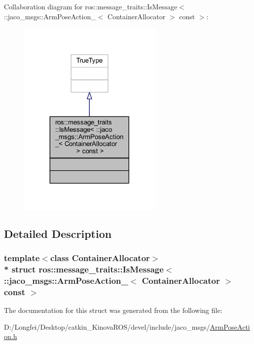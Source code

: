 Collaboration diagram for ros\+:\+:message\+\_\+traits\+:\+:Is\+Message$<$ \+:\+:jaco\+\_\+msgs\+:\+:Arm\+Pose\+Action\+\_\+$<$ Container\+Allocator $>$ const $>$\+:
\nopagebreak
\begin{figure}[H]
\begin{center}
\leavevmode
\includegraphics[width=200pt]{d2/daa/structros_1_1message__traits_1_1IsMessage_3_01_1_1jaco__msgs_1_1ArmPoseAction___3_01ContainerAll62b517e228cf0f5f59a5533fa75f8451}
\end{center}
\end{figure}


\subsection{Detailed Description}
\subsubsection*{template$<$class Container\+Allocator$>$\\*
struct ros\+::message\+\_\+traits\+::\+Is\+Message$<$ \+::jaco\+\_\+msgs\+::\+Arm\+Pose\+Action\+\_\+$<$ Container\+Allocator $>$ const  $>$}



The documentation for this struct was generated from the following file\+:\begin{DoxyCompactItemize}
\item 
D\+:/\+Longfei/\+Desktop/catkin\+\_\+\+Kinova\+R\+O\+S/devel/include/jaco\+\_\+msgs/\hyperlink{ArmPoseAction_8h}{Arm\+Pose\+Action.\+h}\end{DoxyCompactItemize}
